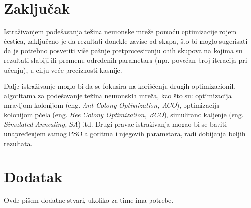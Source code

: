 \documentclass[a4paper]{article}
\begin{document}
\section{Zaključak}
\label{sec:zakljucak}

Istraživanjem podešavanja težina neuronske mreže pomoću optimizacije rojem čestica, zaključeno je da rezultati donekle zavise od skupa, 
što bi moglo sugerisati da je potrebno posvetiti više pažnje pretprocesiranju onih skupova na kojima su rezultati slabiji ili promenu 
određenih parametara (npr. povećan broj iteracija pri učenju), u cilju veće preciznosti kasnije.

Dalje istraživanje moglo bi da se fokusira na korišćenju drugih optimizacionih algoritama za podešavanje težina neuronskih mreža, 
kao što su: optimizacija mravljom kolonijom (eng. \emph{Ant Colony Optimization, ACO}), optimizacija kolonijom 
pčela (eng. \emph{Bee Colony Optimization, BCO}), simulirano kaljenje (eng. \emph{Simulated Annealing, SA}) itd. Drugi pravac 
istraživanja mogao bi se baviti unapređenjem samog PSO algoritma i njegovih parametara, radi dobijanja boljih rezultata.

\appendix
 


\appendix
\section{Dodatak}
Ovde pišem dodatne stvari, ukoliko za time ima potrebe.
\end{document}
